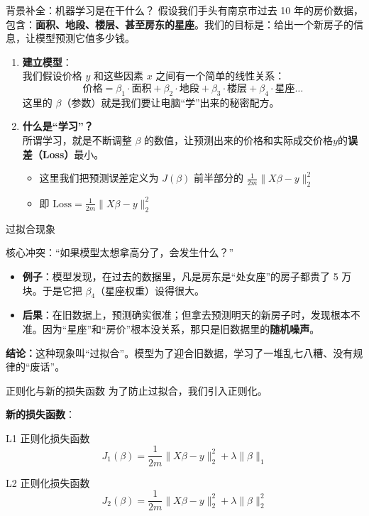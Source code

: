 \documentclass[aspectratio=169]{beamer}
\begin{document}
\begin{frame}{背景补全：机器学习是在干什么？}
    假设我们手头有南京市过去 10 年的房价数据，包含：\textbf{面积、地段、楼层、甚至房东的星座}。我们的目标是：给出一个新房子的信息，让模型预测它值多少钱。
    \begin{enumerate}
        \item \textbf{建立模型}：\\
        我们假设价格 $y$ 和这些因素 $x$ 之间有一个简单的线性关系：
        $$\text{价格} = \beta_1 \cdot \text{面积} + \beta_2 \cdot \text{地段} + \beta_3 \cdot \text{楼层} + \beta_4 \cdot \text{星座} \dots$$
        这里的 $\beta$（参数）就是我们要让电脑“学”出来的秘密配方。
        
        \item \textbf{什么是“学习”？}\\
        所谓学习，就是不断调整 $\beta$ 的数值，让预测出来的价格和实际成交价格$y$的\textbf{误差（Loss）}最小。
        \begin{itemize}
            \item 这里我们把预测误差定义为 $J(\beta)$ 前半部分的 $\frac{1}{2m}\|X\beta - y\|_2^2$ 
            \item 即 $\text{Loss} = \frac{1}{2m}\|X\beta - y\|_2^2$
        \end{itemize}
    \end{enumerate}
\end{frame}

\begin{frame}{过拟合现象}
    \begin{block}{核心冲突：“如果模型太想拿高分了，会发生什么？”}
        \begin{itemize}
            \item \textbf{例子}：模型发现，在过去的数据里，凡是房东是“处女座”的房子都贵了 5 万块。于是它把 $\beta_4$（星座权重）设得很大。
            \item \textbf{后果}：在旧数据上，预测确实很准；但拿去预测明天的新房子时，发现根本不准。因为“星座”和“房价”根本没关系，那只是旧数据里的\textbf{随机噪声}。
        \end{itemize}
    \end{block}
    \vspace{0.5cm}
    \textbf{结论：}这种现象叫“过拟合”。模型为了迎合旧数据，学习了一堆乱七八糟、没有规律的“废话”。
\end{frame}

\begin{frame}{正则化与新的损失函数}
    为了防止过拟合，我们引入正则化。
    
    \vspace{0.5cm}
    \textbf{新的损失函数}：
    \begin{block}{L1 正则化损失函数}
        $$J_1(\beta) = \frac{1}{2m} \|X\beta - y\|_2^2 + \lambda \|\beta\|_1$$
    \end{block}
    \begin{block}{L2 正则化损失函数}
        $$J_2(\beta) = \frac{1}{2m} \|X\beta - y\|_2^2 + \lambda \|\beta\|_2^2$$
    \end{block}
\end{frame}
\end{document}
